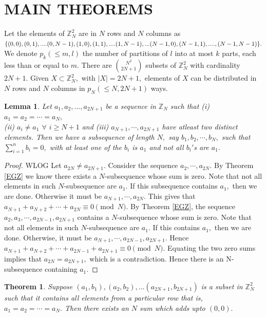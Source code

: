\documentclass[reqno,10pt]{amsart}
\newtheorem{lem}[prop]{ Lemma}
\newtheorem{thm}[prop]{Theorem}
\begin{document}
\section{MAIN THEOREMS}
Let the elements of $\mathbb{Z}^2_{N}$ are in $N$ rows and $N$ columns as 
$\{(0,0), (0,1),....(0,N-1), (1,0), (1,1),....\\(1,N-1),...(N-1,0), (N-1,1),....,(N-1,N-1) \}.$ We denote
$p_k ( \leq m, l ) $ the number of partitions of $l$ into at most $k$ parts, each less than or equal to $m.$
There are ${  N ^2  \choose {2N+1}  }$ subsets of $\mathbb{Z}_N^2$ with cardinality $2N+1.$
Given $X \subset \mathbb{Z}_N^2,$ with $|X| = 2N +1,$ elements of $X$ can be distributed in $N$ rows
and $N$ columns in $p_N ( \leq N, 2N+1 )$ ways.
\begin{lem}
\label{gen}
 Let $a_1,a_2,...,a_{2N+1}$ be a sequence in $\mathbb{Z}_N$ such that (i) $a_1=a_2= \cdots =a_N,$\\(ii) $ a_i \neq a_1$ $\forall$ $i \geq N+1$ and (iii) $a_{N+1},\cdots,a_{2N+1}$ have atleast two distinct elements. Then we have a subsequence of length $N,$ say $b_1,b_2,\cdots,b_N,$ such that $\sum_{i=1}^n b_i = 0,$  with at least one of the  $b_i $ is  $a_1$ and not all $b_i'$s are $a_1.$ 
 \end{lem}
 \begin{proof}
WLOG Let $a_{2N} \neq a_{2N+1}.$ Consider the sequence $a_2,\cdots , a_{2N}.$ By Theorem \ref{EGZ} we know there  exists a $N$-subsequence whose sum is zero. Note that not all elements in such $N$-subsequence are $a_1.$ If this subsequence contains $a_1,$ then we are done. Otherwise it must be $a_{N+1},\cdots , a_{2N}.$ This gives that $a_{N+1}+a_{N+2}+\cdots+a_{2N} \equiv 0 \pmod {N}.$ By  Theorem \ref{EGZ}, the sequence $a_2, a_3, \cdots , a_{2N-1}, a_{2N+1}$ contains a $N$-subsequence whose sum is zero. Note that not all elements in such $N$-subsequence are $a_1.$ If this contains $a_1,$ then we are done. Otherwise, it must be $a_{N+1}, \cdots ,a_{2N-1}, a_{2N+1}.$ Hence $a_{N+1}+a_{N+2}+ \cdots + a_{2N-1}+a_{2N+1} \equiv 0 \pmod{N}.$ Equating the two zero sums implies that $ a_{2N} = a_{2N+1},$ which is a contradiction. Hence there is an N-subsequence containing $a_1.$   
\end{proof}
\begin{thm} \label{Main Theorem 1}Suppose $(a_1,b_1),(a_2,b_2),...(a_{2N+1},b_{2N+1})$ is a subset in ${\mathbb{Z}_N^2}$ such that it contains all elements from a particular row that is, $a_1=a_2= \cdots = a_N.$ Then there exists an $N$ sum which adds upto $(0,0).$
\end{thm}
\end{document}
